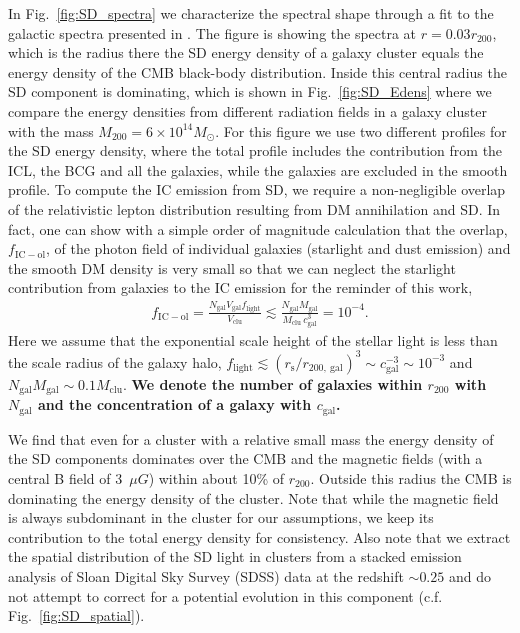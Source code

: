 \documentclass[10pt,aps,pra,reprint,amsmath,amsfonts,amssymb,showpacs,nofootinbib,floatfix]{revtex4-1}
\def\C#1{{\bf #1}}
\newcommand{\rmn}{\mathrm}
\newcommand{\msun}{M_\odot}
\newcommand{\rvir}{r_{200}}
\newcommand{\mvir}{M_{200}}
\begin{document}
In Fig.~\ref{fig:SD_spectra} we characterize the spectral shape
through a fit to the galactic spectra presented in
\cite{2006ApJ...648L..29P}.  The figure is showing the spectra at
$r=0.03\rvir$, which is the radius there the SD energy density of a
galaxy cluster equals the energy density of the CMB black-body
distribution. Inside this central radius the SD component is
dominating, which is shown in Fig.~\ref{fig:SD_Edens} where we compare
the energy densities from different radiation fields in a galaxy
cluster with the mass $\mvir=6\times10^{14}\msun$. For this figure we
use two different profiles for the SD energy density, where the total
profile includes the contribution from the ICL, the BCG and all the
galaxies, while the galaxies are excluded in the smooth profile. To
compute the IC emission from SD, we require a non-negligible overlap
of the relativistic lepton distribution resulting from DM annihilation
and SD.  In fact, one can show with a simple order of magnitude
calculation that the overlap, $f_\rmn{IC-ol}$, of the photon field of
individual galaxies (starlight and dust emission) and the smooth DM
density is very small so that we can neglect the starlight
contribution from galaxies to the IC emission for the reminder of this
work,
\begin{eqnarray}
\label{eq:SD_overlap}
f_\rmn{IC-ol} = \frac{N_\rmn{gal} V_\rmn{gal} f_\rmn{light}}{V_\rmn{clu}}
\lesssim  \frac{N_\rmn{gal} M_\rmn{gal}}{M_\rmn{clu}\,c_\rmn{gal}^{3}}=10^{-4}.
\end{eqnarray}
Here we assume that the exponential scale height of the stellar light
is less than the scale radius of the galaxy halo, $f_\rmn{light}
\lesssim (r_\rmn{s} / r_{200,~\rmn{gal}})^3 \sim c_\rmn{gal}^{-3} \sim
10^{-3}$ and $N_\rmn{gal} M_\rmn{gal} \sim 0.1 M_\rmn{clu}$. \C{We
  denote the number of galaxies within $\rvir$ with $N_\rmn{gal}$ and
  the concentration of a galaxy with $c_\rmn{gal}$.}

We find that even for a cluster with a relative small mass the energy
density of the SD components dominates over the CMB and the magnetic
fields (with a central B field of 3~$\mu G$) within about 10\% of
$\rvir$. Outside this radius the CMB is dominating the energy density
of the cluster.  Note that while the magnetic field is always
subdominant in the cluster for our assumptions, we keep its
contribution to the total energy density for consistency. Also note
that we extract the spatial distribution of the SD light in clusters
from a stacked emission analysis of Sloan Digital Sky Survey (SDSS)
data at the redshift $\sim 0.25$ \cite{2005MNRAS.358..949Z} and do not
attempt to correct for a potential evolution in this component
(c.f. Fig.~\ref{fig:SD_spatial}).
\end{document}
